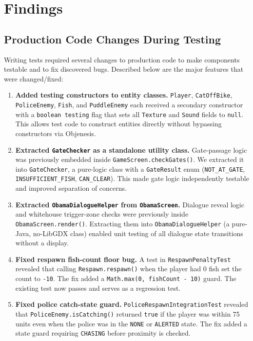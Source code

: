 \documentclass[12pt]{article}
\begin{document}
\section{Findings}
\label{sec:findings}

\subsection{Production Code Changes During Testing}

Writing tests required several changes to production code to make components testable and to fix discovered bugs. Described below are the major features that were changed/fixed:

\begin{enumerate}[itemsep=4pt]

  \item \textbf{Added testing constructors to entity classes.}
    \texttt{Player}, \texttt{CatOffBike}, \texttt{PoliceEnemy}, \texttt{Fish}, and \texttt{PuddleEnemy} each received a secondary constructor with a \texttt{boolean testing} flag that sets all \texttt{Texture} and \texttt{Sound} fields to \texttt{null}. This allows test code to construct entities directly without bypassing constructors via Objenesis.

  \item \textbf{Extracted \texttt{GateChecker} as a standalone utility class.}
    Gate-passage logic was previously embedded inside \texttt{GameScreen.checkGates()}. We extracted it into \texttt{GateChecker}, a pure-logic class with a \texttt{GateResult} enum (\texttt{NOT\_AT\_GATE}, \texttt{INSUFFICIENT\_FISH}, \texttt{CAN\_CLEAR}). This made gate logic independently testable and improved separation of concerns.

  \item \textbf{Extracted \texttt{ObamaDialogueHelper} from \texttt{ObamaScreen}.}
    Dialogue reveal logic and whitehouse trigger-zone checks were previously inside \texttt{ObamaScreen.render()}. Extracting them into \texttt{ObamaDialogueHelper} (a pure-Java, no-LibGDX class) enabled unit testing of all dialogue state transitions without a display.

  \item \textbf{Fixed respawn fish-count floor bug.}
    A test in \texttt{RespawnPenaltyTest} revealed that calling \texttt{Respawn.respawn()} when the player had 0 fish set the count to \texttt{-10}. The fix added a \texttt{Math.max(0, fishCount - 10)} guard. The existing test now passes and serves as a regression test.

  \item \textbf{Fixed police catch-state guard.}
    \texttt{PoliceRespawnIntegrationTest} revealed that \texttt{PoliceEnemy.isCatching()} returned \texttt{true} if the player was within 75 units even when the police was in the \texttt{NONE} or \texttt{ALERTED} state. The fix added a state guard requiring \texttt{CHASING} before proximity is checked.

\end{enumerate}
\end{document}

